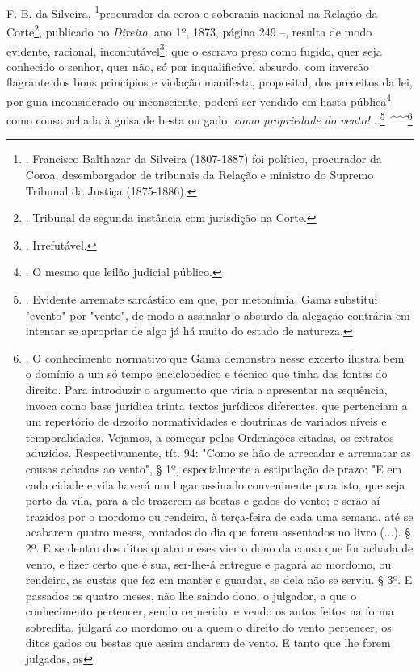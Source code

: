 F. B. da Silveira, \footnote{. Francisco Balthazar da Silveira
  (1807-1887) foi político, procurador da Coroa, desembargador de
  tribunais da Relação e ministro do Supremo Tribunal da Justiça
  (1875-1886).}procurador da coroa e soberania nacional na Relação da
Corte\footnote{. Tribunal de segunda instância com jurisdição na Corte.},
publicado no \emph{Direito}, ano 1º, 1873, página 249 --, resulta de
modo evidente, racional, inconfutável\footnote{. Irrefutável.}: que o
escravo preso como fugido, quer seja conhecido o senhor, quer não, só
por inqualificável absurdo, com inversão flagrante dos bons princípios e
violação manifesta, proposital, dos preceitos da lei, por guia
inconsiderado ou inconsciente, poderá ser vendido em hasta
pública\footnote{. O mesmo que leilão judicial público.} como cousa
achada à guisa de besta ou gado, \emph{como propriedade do
vento!...}\footnote{. Evidente arremate sarcástico em que, por
  metonímia, Gama substitui "evento" por "vento", de modo a assinalar o
  absurdo da alegação contrária em intentar se apropriar de algo já há
  muito do estado de natureza.} \emph{\^{}\^{}\^{}}\footnote{. O
  conhecimento normativo que Gama demonstra nesse excerto ilustra bem o
  domínio a um só tempo enciclopédico e técnico que tinha das fontes do
  direito. Para introduzir o argumento que viria a apresentar na
  sequência, invoca como base jurídica trinta textos jurídicos
  diferentes, que pertenciam a um repertório de dezoito normatividades e
  doutrinas de variados níveis e temporalidades. Vejamos, a começar
  pelas Ordenações citadas, os extratos aduzidos. Respectivamente, tít.
  94: "Como se hão de arrecadar e arrematar as cousas achadas ao vento",
  § 1º, especialmente a estipulação de prazo: "E em cada cidade e vila
  haverá um lugar assinado conveninente para isto, que seja perto da
  vila, para a ele trazerem as bestas e gados do vento; e serão aí
  trazidos por o mordomo ou rendeiro, à terça-feira de cada uma semana,
  até se acabarem quatro meses, contados do dia que forem assentados no
  livro (...). § 2º. E se dentro dos ditos quatro meses vier o dono da
  cousa que for achada de vento, e fizer certo que é sua, ser-lhe-á
  entregue e pagará ao mordomo, ou rendeiro, as custas que fez em manter
  e guardar, se dela não se serviu. § 3º. E passados os quatro meses,
  não lhe saindo dono, o julgador, a que o conhecimento pertencer, sendo
  requerido, e vendo os autos feitos na forma sobredita, julgará ao
  mordomo ou a quem o direito do vento pertencer, os ditos gados ou
  bestas que assim andarem de vento. E tanto que lhe forem julgadas, as
}
